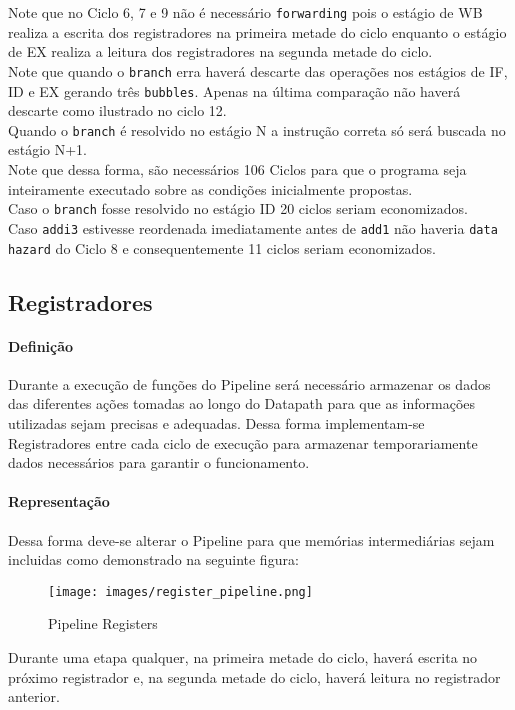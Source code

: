 \documentclass{article}
\begin{document}
Note que no Ciclo 6, 7 e 9 não é necessário \texttt{forwarding} pois o estágio de WB realiza a escrita dos registradores na primeira metade do ciclo enquanto o estágio de EX realiza a leitura dos registradores na segunda metade do ciclo.\\

\noindent Note que quando o \texttt{branch} erra haverá descarte das operações nos estágios de IF, ID e EX gerando três \texttt{bubbles}. Apenas na última comparação não haverá descarte como ilustrado no ciclo 12.\\

\noindent Quando o \texttt{branch} é resolvido no estágio N a instrução correta só será buscada no estágio N+1.\\

\noindent Note que dessa forma, são necessários 106 Ciclos para que o programa seja inteiramente executado sobre as condições inicialmente propostas.\\

\noindent Caso o \texttt{branch} fosse resolvido no estágio ID 20 ciclos seriam economizados.\\

\noindent Caso \texttt{addi3} estivesse reordenada imediatamente antes de \texttt{add1} não haveria \texttt{data hazard} do Ciclo 8 e consequentemente 11 ciclos seriam economizados.\\

\subsection{Registradores}
\paragraph{Definição}Durante a execução de funções do Pipeline será necessário armazenar os dados das diferentes ações tomadas ao longo do Datapath para que as informações utilizadas sejam precisas e adequadas. Dessa forma implementam-se Registradores entre cada ciclo de execução para armazenar temporariamente dados necessários para garantir o funcionamento.

\paragraph{Representação}Dessa forma deve-se alterar o Pipeline para que memórias intermediárias sejam incluidas como demonstrado na seguinte figura:
\begin{figure}[H]
    \centering
    \texttt{[image: images/register\_pipeline.png]}
    \caption{Pipeline Registers}
    \label{pipelineRegisters}
\end{figure}
\noindent Durante uma etapa qualquer, na primeira metade do ciclo, haverá escrita no próximo registrador e, na segunda metade do ciclo, haverá leitura no registrador anterior.\\
\end{document}
